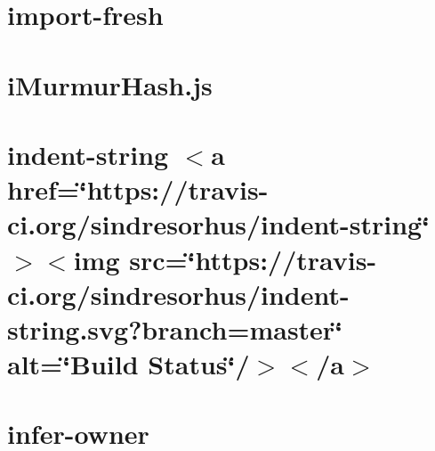 \documentclass[twoside]{book}
\newcommand{\+}{\discretionary{\mbox{\scriptsize$\hookleftarrow$}}{}{}}
\begin{document}
\chapter{import-\/fresh}
\label{md__c___users_vaishnavi_jadhav__desktop__developer_code_mean_stack_example_client_node_modules_import_fresh_readme}

\chapter{i\+Murmur\+Hash.\+js}
\label{md__c___users_vaishnavi_jadhav__desktop__developer_code_mean_stack_example_client_node_modules_imurmurhash__r_e_a_d_m_e}

\chapter{indent-\/string \texorpdfstring{$<$}{<}a href=\char`\"{}https\+://travis-\/ci.\+org/sindresorhus/indent-\/string\char`\"{} \texorpdfstring{$>$}{>}\texorpdfstring{$<$}{<}img src=\char`\"{}https\+://travis-\/ci.\+org/sindresorhus/indent-\/string.\+svg?branch=master\char`\"{} alt=\char`\"{}\+Build Status\char`\"{}/\texorpdfstring{$>$}{>}\texorpdfstring{$<$}{<}/a\texorpdfstring{$>$}{>}}
\label{md__c___users_vaishnavi_jadhav__desktop__developer_code_mean_stack_example_client_node_modules_indent_string_readme}

\chapter{infer-\/owner}
\label{md__c___users_vaishnavi_jadhav__desktop__developer_code_mean_stack_example_client_node_modules_infer_owner__r_e_a_d_m_e}

\end{document}
